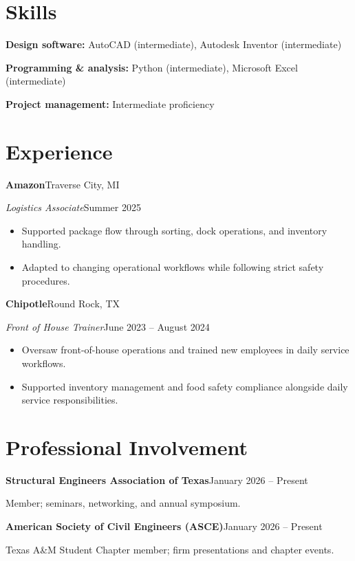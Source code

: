 \documentclass[11pt,letterpaper]{article}
\newcommand{\entry}[4]{%
  \Needspace{5\baselineskip}%
  \textbf{#1}\hfill{\small\color{muted}#2}\par
  {\itshape #3}\hfill{\small\color{muted}#4}\par
}
\begin{document}
\section{Skills}
\textbf{Design software:} AutoCAD (intermediate), Autodesk Inventor (intermediate)\par
\vspace{3pt}
\textbf{Programming \& analysis:} Python (intermediate), Microsoft Excel (intermediate)\par
\vspace{3pt}
\textbf{Project management:} Intermediate proficiency

\section{Experience}
\entry{Amazon}{Traverse City, MI}
      {Logistics Associate}{Summer 2025}
\begin{itemize}
  \item Supported package flow through sorting, dock operations, and inventory handling.
  \item Adapted to changing operational workflows while following strict safety procedures.
\end{itemize}
\vspace{7pt}
\entry{Chipotle}{Round Rock, TX}
      {Front of House Trainer}{June 2023 -- August 2024}
\begin{itemize}
  \item Oversaw front-of-house operations and trained new employees in daily service workflows.
  \item Supported inventory management and food safety compliance alongside daily service responsibilities.
\end{itemize}

\section{Professional Involvement}
\textbf{Structural Engineers Association of Texas}\hfill{\small\color{muted}January 2026 -- Present}\par
Member; seminars, networking, and annual symposium.\par
\vspace{5pt}
\textbf{American Society of Civil Engineers (ASCE)}\hfill{\small\color{muted}January 2026 -- Present}\par
Texas A\&M Student Chapter member; firm presentations and chapter events.
\end{document}
